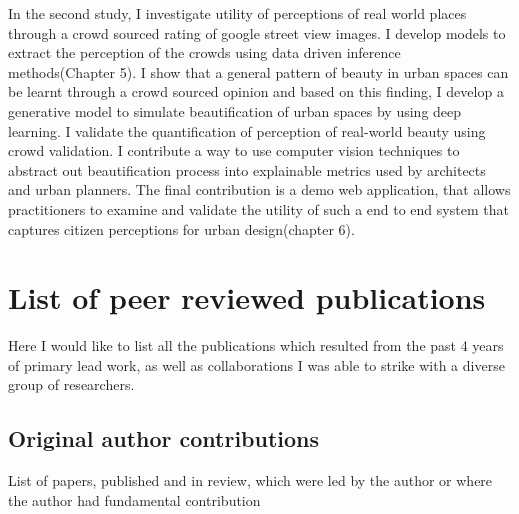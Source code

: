 In the second study, I investigate utility of perceptions of real world places through a crowd sourced rating of google street view images. I develop models to extract the perception of the crowds using data driven inference methods(Chapter 5).
I show that a general pattern of beauty in urban spaces can be learnt through a crowd sourced opinion and based on this finding, I develop a generative model to simulate beautification of urban spaces by using deep learning. I validate the quantification of perception of real-world beauty using crowd validation. I contribute a way to use computer vision techniques to abstract out beautification process into explainable metrics used by architects and urban planners. The final contribution is a demo web application, that allows practitioners to examine and validate the utility of such a end to end system that captures citizen perceptions for urban design(chapter 6). 



\section{List of peer reviewed publications}

Here I would like to list all the publications which resulted from the past 4 years of primary lead work, as well as collaborations I was able to strike with a diverse group of researchers.

\subsection{Original author contributions}
List of papers, published and in review, which were led by the author or where the author had fundamental contribution

